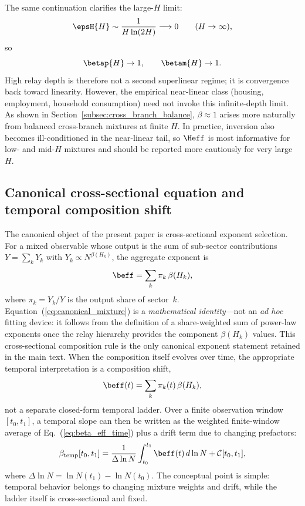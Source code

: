 The same continuation clarifies the large-\(H\) limit:
\begin{equation}
\epsH{H}\sim \frac{1}{H\ln(2H)}\longrightarrow 0\qquad (H\to\infty),
\label{eq:largeH}
\end{equation}
so
\begin{equation}
\betap{H}\to 1,\qquad\betam{H}\to 1.
\label{eq:linear_limit}
\end{equation}
High relay depth is therefore not a second superlinear regime; it is
convergence back toward linearity.
However, the empirical near-linear class (housing, employment, household
consumption) need not invoke this infinite-depth limit.
As shown in Section~\ref{subsec:cross_branch_balance}, $\beta\approx 1$
arises more naturally from balanced cross-branch mixtures at finite $H$.
In practice, inversion also becomes ill-conditioned in the near-linear tail,
so \(\Heff\) is most informative for low- and mid-\(H\) mixtures and should
be reported more cautiously for very large \(H\).

\subsection{Canonical cross-sectional equation and temporal composition shift}

The canonical object of the present paper is cross-sectional exponent
selection.
For a mixed observable whose output is the sum of sub-sector contributions
$Y=\sum_k Y_k$ with $Y_k\propto N^{\beta(H_k)}$, the aggregate exponent
is
\begin{equation}
\beff=\sum_k \pi_k\,\beta(H_k),
\label{eq:canonical_mixture}
\end{equation}
where $\pi_k=Y_k/Y$ is the output share of sector~$k$.
Equation~(\ref{eq:canonical_mixture}) is a \emph{mathematical identity}---not
an \emph{ad hoc} fitting device: it follows from the definition of a
share-weighted sum of power-law exponents once the relay hierarchy provides
the component $\beta(H_k)$ values.
This cross-sectional composition rule is the only canonical exponent
statement retained in the main text.
When the composition itself evolves over time, the appropriate temporal
interpretation is a composition shift,
\begin{equation}
\beff(t)=\sum_k \pi_k(t)\,\beta(H_k),
\label{eq:beta_eff_time}
\end{equation}
not a separate closed-form temporal ladder.
Over a finite observation window \([t_0,t_1]\), a temporal slope can then be
written as the weighted finite-window average of Eq.~(\ref{eq:beta_eff_time})
plus a drift term due to changing prefactors:
\begin{equation}
\beta_{\mathrm{temp}}[t_0,t_1]=
\frac{1}{\Delta\ln N}\int_{t_0}^{t_1}\beff(t)\,d\ln N
+\mathcal{C}[t_0,t_1],
\label{eq:temporal_fd}
\end{equation}
where \(\Delta\ln N=\ln N(t_1)-\ln N(t_0)\).
The conceptual point is simple: temporal behavior belongs to changing mixture
weights and drift, while the ladder itself is cross-sectional and fixed.

